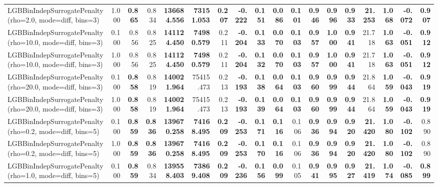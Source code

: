 \documentclass[11pt]{article}
\theoremstyle{plain}
\theoremstyle{definition}
\newcommand{\1}{\mathbf{1}}
\begin{document}
\begin{table}[htbp]
{\begin{tabular}{lrrrrrrrrrrrrrrrrr}
LGBBinIndepSurrogatePenalty(rho=2.0, mode=diff, bins=3) & 1.000 & \textbf{0.865} & 0.834 & \textbf{136684.556} & \textbf{73151.053} & \textbf{0.207} & \textbf{-0.222} & \textbf{0.151} & \textbf{0.086} & \textbf{0.101} & \textbf{0.946} & \textbf{0.996} & \textbf{0.933} & \textbf{21.253} & \textbf{1.068} & \textbf{-0.072} & \textbf{0.907} \\
LGBBinIndepSurrogatePenalty(rho=10.0, mode=diff, bins=3) & 0.100 & 0.856 & 0.825 & \textbf{141124.450} & \textbf{74980.579} & 0.211 & \textbf{-0.204} & \textbf{0.133} & \textbf{0.070} & \textbf{0.103} & \textbf{0.957} & \textbf{1.000} & \textbf{0.941} & 21.718 & \textbf{1.063} & \textbf{-0.051} & \textbf{0.912} \\
LGBBinIndepSurrogatePenalty(rho=10.0, mode=diff, bins=3) & 1.000 & 0.856 & 0.825 & \textbf{141124.450} & \textbf{74980.579} & 0.211 & \textbf{-0.204} & \textbf{0.132} & \textbf{0.070} & \textbf{0.103} & \textbf{0.957} & \textbf{1.000} & \textbf{0.941} & 21.718 & \textbf{1.063} & \textbf{-0.051} & \textbf{0.912} \\
LGBBinIndepSurrogatePenalty(rho=20.0, mode=diff, bins=3) & 0.100 & \textbf{0.858} & 0.819 & \textbf{140021.964} & 75415.473 & 0.213 & \textbf{-0.193} & \textbf{0.138} & \textbf{0.064} & \textbf{0.103} & \textbf{0.960} & \textbf{0.999} & \textbf{0.944} & 21.864 & \textbf{1.059} & \textbf{-0.043} & \textbf{0.919} \\
LGBBinIndepSurrogatePenalty(rho=20.0, mode=diff, bins=3) & 1.000 & \textbf{0.858} & 0.819 & \textbf{140021.964} & 75415.473 & 0.213 & \textbf{-0.193} & \textbf{0.139} & \textbf{0.064} & \textbf{0.103} & \textbf{0.960} & \textbf{0.999} & \textbf{0.944} & 21.864 & \textbf{1.059} & \textbf{-0.043} & \textbf{0.919} \\
LGBBinIndepSurrogatePenalty(rho=0.2, mode=diff, bins=5) & 0.100 & \textbf{0.859} & \textbf{0.836} & \textbf{139670.258} & \textbf{74168.495} & \textbf{0.209} & \textbf{-0.253} & \textbf{0.171} & \textbf{0.116} & 0.106 & \textbf{0.936} & \textbf{0.994} & \textbf{0.920} & \textbf{21.420} & \textbf{1.080} & \textbf{-0.102} & 0.890 \\
LGBBinIndepSurrogatePenalty(rho=0.2, mode=diff, bins=5) & 1.000 & \textbf{0.859} & \textbf{0.836} & \textbf{139670.258} & \textbf{74168.495} & \textbf{0.209} & \textbf{-0.253} & \textbf{0.170} & \textbf{0.116} & 0.106 & \textbf{0.936} & \textbf{0.994} & \textbf{0.920} & \textbf{21.420} & \textbf{1.080} & \textbf{-0.102} & 0.890 \\
LGBBinIndepSurrogatePenalty(rho=1.0, mode=diff, bins=5) & 0.100 & \textbf{0.859} & 0.834 & \textbf{139558.403} & \textbf{73869.408} & \textbf{0.209} & \textbf{-0.236} & \textbf{0.156} & \textbf{0.099} & 0.105 & \textbf{0.941} & \textbf{0.995} & \textbf{0.927} & \textbf{21.419} & \textbf{1.074} & \textbf{-0.085} & \textbf{0.899} \\

\end{tabular}}
\end{table}
\end{document}
